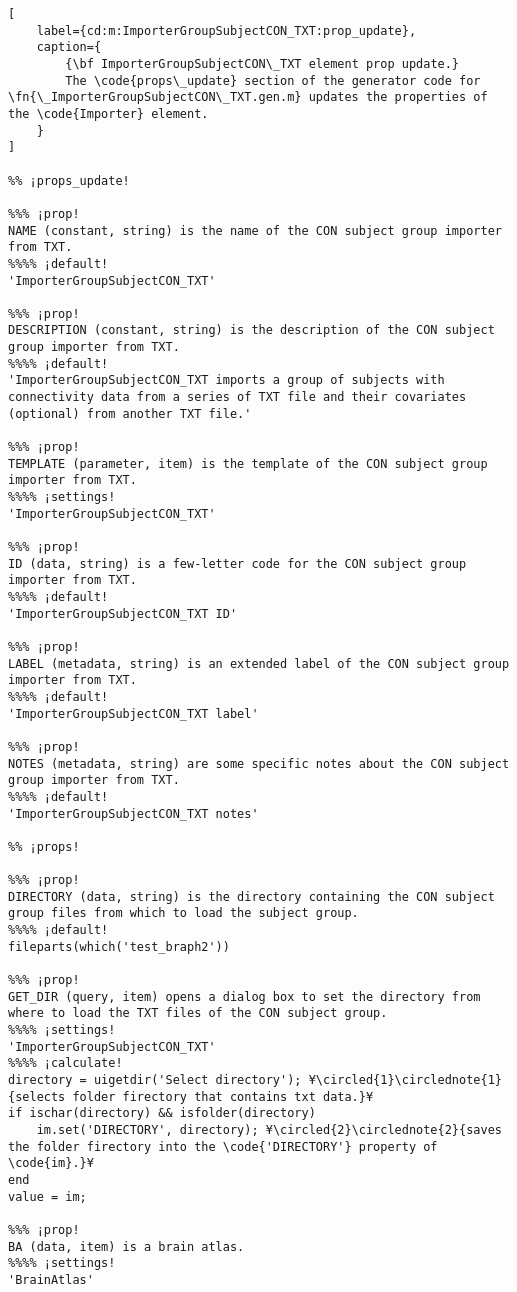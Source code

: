 \documentclass{tufte-handout}
\begin{document}
\begin{lstlisting}[
	label={cd:m:ImporterGroupSubjectCON_TXT:prop_update},
	caption={
		{\bf ImporterGroupSubjectCON\_TXT element prop update.}
		The \code{props\_update} section of the generator code for \fn{\_ImporterGroupSubjectCON\_TXT.gen.m} updates the properties of the \code{Importer} element.
	}
]

%% ¡props_update!

%%% ¡prop!
NAME (constant, string) is the name of the CON subject group importer from TXT.
%%%% ¡default!
'ImporterGroupSubjectCON_TXT'

%%% ¡prop!
DESCRIPTION (constant, string) is the description of the CON subject group importer from TXT.
%%%% ¡default!
'ImporterGroupSubjectCON_TXT imports a group of subjects with connectivity data from a series of TXT file and their covariates (optional) from another TXT file.'

%%% ¡prop!
TEMPLATE (parameter, item) is the template of the CON subject group importer from TXT.
%%%% ¡settings!
'ImporterGroupSubjectCON_TXT'

%%% ¡prop!
ID (data, string) is a few-letter code for the CON subject group importer from TXT.
%%%% ¡default!
'ImporterGroupSubjectCON_TXT ID'

%%% ¡prop!
LABEL (metadata, string) is an extended label of the CON subject group importer from TXT.
%%%% ¡default!
'ImporterGroupSubjectCON_TXT label'

%%% ¡prop!
NOTES (metadata, string) are some specific notes about the CON subject group importer from TXT.
%%%% ¡default!
'ImporterGroupSubjectCON_TXT notes'

%% ¡props!

%%% ¡prop!
DIRECTORY (data, string) is the directory containing the CON subject group files from which to load the subject group. 
%%%% ¡default!
fileparts(which('test_braph2'))

%%% ¡prop!
GET_DIR (query, item) opens a dialog box to set the directory from where to load the TXT files of the CON subject group.
%%%% ¡settings!
'ImporterGroupSubjectCON_TXT'
%%%% ¡calculate!
directory = uigetdir('Select directory'); ¥\circled{1}\circlednote{1}{selects folder firectory that contains txt data.}¥
if ischar(directory) && isfolder(directory)
	im.set('DIRECTORY', directory); ¥\circled{2}\circlednote{2}{saves the folder firectory into the \code{'DIRECTORY'} property of \code{im}.}¥
end
value = im;

%%% ¡prop!
BA (data, item) is a brain atlas.
%%%% ¡settings!
'BrainAtlas'


\end{lstlisting}
\end{document}
